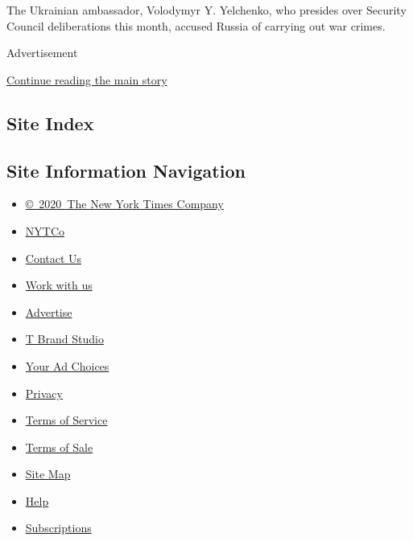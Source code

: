 The Ukrainian ambassador, Volodymyr Y. Yelchenko, who presides over
Security Council deliberations this month, accused Russia of carrying
out war crimes.

Advertisement

\protect\hyperlink{after-bottom}{Continue reading the main story}

\hypertarget{site-index}{%
\subsection{Site Index}\label{site-index}}

\hypertarget{site-information-navigation}{%
\subsection{Site Information
Navigation}\label{site-information-navigation}}

\begin{itemize}
\tightlist
\item
  \href{https://help.nytimes.com/hc/en-us/articles/115014792127-Copyright-notice}{©~2020~The
  New York Times Company}
\end{itemize}

\begin{itemize}
\tightlist
\item
  \href{https://www.nytco.com/}{NYTCo}
\item
  \href{https://help.nytimes.com/hc/en-us/articles/115015385887-Contact-Us}{Contact
  Us}
\item
  \href{https://www.nytco.com/careers/}{Work with us}
\item
  \href{https://nytmediakit.com/}{Advertise}
\item
  \href{http://www.tbrandstudio.com/}{T Brand Studio}
\item
  \href{https://www.nytimes.com/privacy/cookie-policy\#how-do-i-manage-trackers}{Your
  Ad Choices}
\item
  \href{https://www.nytimes.com/privacy}{Privacy}
\item
  \href{https://help.nytimes.com/hc/en-us/articles/115014893428-Terms-of-service}{Terms
  of Service}
\item
  \href{https://help.nytimes.com/hc/en-us/articles/115014893968-Terms-of-sale}{Terms
  of Sale}
\item
  \href{https://spiderbites.nytimes.com}{Site Map}
\item
  \href{https://help.nytimes.com/hc/en-us}{Help}
\item
  \href{https://www.nytimes.com/subscription?campaignId=37WXW}{Subscriptions}
\end{itemize}
